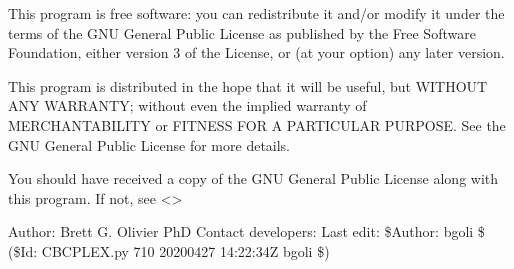 \documentclass[letterpaper,10pt,english]{sphinxmanual}
\begin{document}
\sphinxAtStartPar
This program is free software: you can redistribute it and/or modify
it under the terms of the GNU General Public License as published by
the Free Software Foundation, either version 3 of the License, or
(at your option) any later version.

\sphinxAtStartPar
This program is distributed in the hope that it will be useful,
but WITHOUT ANY WARRANTY; without even the implied warranty of
MERCHANTABILITY or FITNESS FOR A PARTICULAR PURPOSE.  See the
GNU General Public License for more details.

\sphinxAtStartPar
You should have received a copy of the GNU General Public License
along with this program.  If not, see \textless{}\textgreater{}

\sphinxAtStartPar
Author: Brett G. Olivier PhD
Contact developers: 
Last edit: \$Author: bgoli \$ (\$Id: CBCPLEX.py 710 2020\sphinxhyphen{}04\sphinxhyphen{}27 14:22:34Z bgoli \$)
\end{document}

